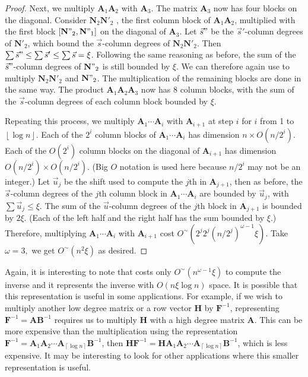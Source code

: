 \begin{proof}
Next, we multiply $\mathbf{A}_{1}\mathbf{A}_{2}$ with $\mathbf{A}_{3}$.
The matrix $\mathbf{A}_{3}$ now has four blocks on the diagonal.
Consider $\mathbf{N}_{2}\mathbf{N}'_{2}$ , the first column block
of $\mathbf{A}_{1}\mathbf{A}_{2}$, multiplied with the first block
$\left[\mathbf{N}"_{2},\mathbf{N}"_{1}\right]$ on the diagonal of
$\mathbf{A}_{3}$. Let $\vec{s}"$ be the $\vec{s}'$-column degrees
of $\mathbf{N}'_{2}$, which bound the $\vec{s}$-column degrees of
$\mathbf{N}_{2}\mathbf{N}'_{2}$. Then $\sum\vec{s}"\le\sum\vec{s}'\le\sum\vec{s}=\xi$.
Following the same reasoning as before, the sum of the $\vec{s}"$-column
degrees of $\mathbf{N}"_{2}$ is still bounded by $\xi$. We can therefore
again use  to multiply
$\mathbf{N}_{2}\mathbf{N}'_{2}$ and $\mathbf{N}"_{2}$. The multiplication
of the remaining blocks are done in the same way. The product $\mathbf{A}_{1}\mathbf{A}_{2}\mathbf{A}_{3}$
now has 8 column blocks, with the sum of the $\vec{s}$-column degrees
of each column block bounded by $\xi$.

Repeating this process, we multiply $\mathbf{A}_{1}\cdots\mathbf{A}_{i}$
with $\mathbf{A}_{i+1}$ at step $i$ for $i$ from 1 to $\left\lfloor \log n\right\rfloor $.
Each of the $2^{i}$ column blocks of $\mathbf{A}_{1}\cdots\mathbf{A}_{i}$
has dimension $n\times O(n/2^{i})$. Each of the $O(2^{i})$ column
blocks on the diagonal of $\mathbf{A}_{i+1}$ has dimension $O(n/2^{i})\times O(n/2^{i})$.
(Big $O$ notation is used here because $n/2^{i}$ may not be an integer.)
Let $\vec{u}_{j}$ be the shift used to compute the $j$th in $\mathbf{A}_{j+1}$,
then as before, the $\vec{s}$-column degrees of the $j$th column
block in $\mathbf{A}_{1}\cdots\mathbf{A}_{i}$ are bounded by $\vec{u}_{j}$,
with $\sum\vec{u}_{j}\le\xi$. The sum of the $\vec{u}$-column degrees
of the $j$th block in $\mathbf{A}_{j+1}$ is bounded by $2\xi$.
(Each of the left half and the right half has the sum bounded by $\xi$.)
Therefore, multiplying $\mathbf{A}_{1}\cdots\mathbf{A}_{i}$ with
$\mathbf{A}_{i+1}$ cost $O^{\sim}\left(2^{j}2^{j}\left(n/2^{j}\right)^{\omega-1}\xi\right)$.
Take $\omega=3,$ we get $O^{\sim}\left(n^{2}\xi\right)$ as desired.
\end{proof}
Again, it is interesting to note that 
costs only $O^{\sim}\left(n^{\omega-1}\xi\right)$ to compute the
inverse and it represents the inverse with $O\left(n\xi\log n\right)$
space. It is possible that this representation is useful in some applications.
For example, if we wish to multiply another low degree matrix or a
row vector $\mathbf{H}$ by $\mathbf{F}^{-1}$, representing $\mathbf{F}^{-1}=\mathbf{A}\mathbf{B}^{-1}$
requires us to multiply $\mathbf{H}$ with a high degree matrix $\mathbf{A}$.
This can be more expensive than the multiplication using the representation
$\mathbf{F}^{-1}=\mathbf{A}_{1}\mathbf{A}_{2}\cdots\mathbf{A}_{\left\lceil \log n\right\rceil }\mathbf{B}^{-1}$,
then $\mathbf{H}\mathbf{F}^{-1}=\mathbf{H}\mathbf{A}_{1}\mathbf{A}_{2}\cdots\mathbf{A}_{\left\lceil \log n\right\rceil }\mathbf{B}^{-1}$,
which is less expensive. It may be interesting to look for other applications
where this smaller representation is useful.
